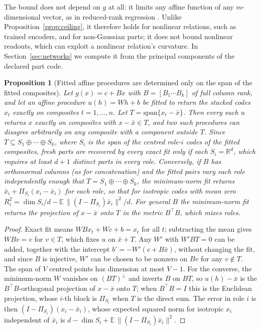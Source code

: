 \documentclass[10pt]{article}
\theoremstyle{plain}
\newtheorem{proposition}{Proposition}
\theoremstyle{remark}
\newcommand{\R}{\mathbb{R}}
\begin{document}
\noindent
The bound does not depend on $g$ at all: it limits any affine function of any $m$-dimensional vector, as in reduced-rank regression \citep{izenman1975}. Unlike Proposition~\ref{prop:ceiling}, it therefore holds for nonlinear relations, such as trained encoders, and for non-Gaussian parts; it does not bound nonlinear readouts, which can exploit a nonlinear relation's curvature. In Section~\ref{sec:networks} we compute it from the principal components of the declared part code.

\begin{proposition}[Fitted affine procedures are determined only on the span of the fitted composites]
\label{prop:span}
Let $g(x) = c + Bx$ with $B = [B_1 \cdots B_k]$ of full column rank, and let an affine procedure $u(h) = Wh + b$ be fitted to return the stacked codes $x_t$ exactly on composites $t = 1, \ldots, n$. Let $T = \mathrm{span}\{x_t - \bar{x}\}$. Then every such $u$ returns $x$ exactly on composites with $x - \bar{x} \in T$, and two such procedures can disagree arbitrarily on any composite with a component outside $T$. Since $T \subseteq S_1 \oplus \cdots \oplus S_k$, where $S_i$ is the span of the centred role-$i$ codes of the fitted composites, fresh parts are recovered by every exact fit only if each $S_i = \R^d$, which requires at least $d + 1$ distinct parts in every role. Conversely, if $B$ has orthonormal columns (as for concatenation) and the fitted pairs vary each role independently enough that $T = S_1 \oplus \cdots \oplus S_k$, the minimum-norm fit returns $\bar{x}_i + \Pi_{S_i}(x_i - \bar{x}_i)$ for each role, so that for isotropic codes with mean zero $R^2_i = \dim S_i/d - \mathbb{E}\,\lVert (I - \Pi_{S_i})\bar{x}_i \rVert^2/d$. For general $B$ the minimum-norm fit returns the projection of $x - \bar{x}$ onto $T$ in the metric $B^{\top}B$, which mixes roles.
\end{proposition}

\begin{proof}
Exact fit means $WBx_t + Wc + b = x_t$ for all $t$; subtracting the mean gives $WBv = v$ for $v \in T$, which fixes $u$ on $\bar{x} + T$. Any $W'$ with $W'BT = 0$ can be added, together with the intercept $b' = -W'(c + B\bar{x})$, without changing the fit, and since $B$ is injective, $W'$ can be chosen to be nonzero on $B v$ for any $v \notin T$. The span of $V$ centred points has dimension at most $V - 1$. For the converse, the minimum-norm $W$ vanishes on $(BT)^{\perp}$ and inverts $B$ on $BT$, so $u(h) - \bar{x}$ is the $B^{\top}B$-orthogonal projection of $x - \bar{x}$ onto $T$; when $B^{\top}B = I$ this is the Euclidean projection, whose $i$-th block is $\Pi_{S_i}$ when $T$ is the direct sum. The error in role $i$ is then $(I - \Pi_{S_i})(x_i - \bar{x}_i)$, whose expected squared norm for isotropic $x_i$ independent of $\bar{x}_i$ is $d - \dim S_i + \mathbb{E}\,\lVert (I - \Pi_{S_i})\bar{x}_i \rVert^2$.
\end{proof}
\end{document}
